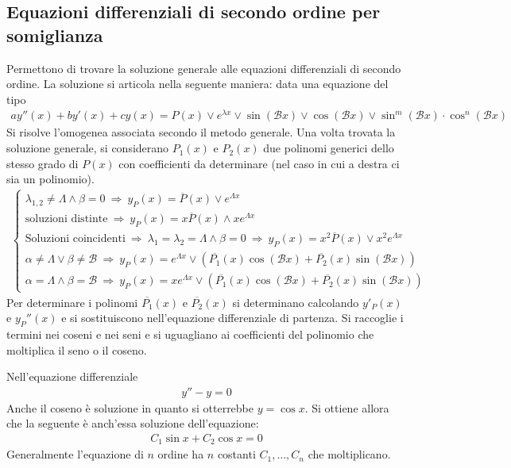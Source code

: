\documentclass[a4paper, oneside]{book}
\begin{document}
\subsection{Equazioni differenziali di secondo ordine per somiglianza}
Permettono di trovare la soluzione generale alle equazioni differenziali di 
secondo ordine. La soluzione si articola nella seguente maniera: data una 
equazione del tipo
\begin{gather*}
    ay''(x) + by'(x) + cy(x) = P(x) \vee e^{\lambda x} \vee \sin(\mathcal{B}x) \vee \cos(\mathcal{B}x) \vee \sin^{m}(\mathcal{B}x) \cdot \cos^{n}(\mathcal{B}x)
\end{gather*}
Si risolve l'omogenea associata secondo il metodo generale. Una volta trovata la soluzione generale, 
si considerano $P_1(x)$ e $P_2(x)$ due polinomi generici dello stesso grado di $P(x)$ 
con coefficienti da determinare (nel caso in cui a destra ci sia un polinomio). 
\begin{gather*}
    \left\{\begin{array}{l}
        \lambda_{1, 2} \neq \Lambda \wedge  \beta = 0 \ \Longrightarrow \ y_P(x) = \overline{P}(x) \vee e^{\Lambda x} \\
        \text{soluzioni distinte} \ \Longrightarrow \ y_P(x) = x\overline{P}(x) \wedge  xe^{\Lambda x} \\
        \text{Soluzioni coincidenti} \ \Longrightarrow \ \lambda_1 = \lambda_2  = \Lambda \wedge  \beta = 0 \ \Longrightarrow \ y_P(x) = x^{2} \overline{P}(x) \vee x^{2}e^{\Lambda x} \\
        \alpha \neq \Lambda \vee \beta \neq \mathcal{B} \ \Longrightarrow \ y_P(x) = e^{\Lambda x} \vee \left(\overline{P_1}(x) \cos(\mathcal{B}x) + \overline{P_2}(x) \sin(\mathcal{B}x) \right)  \\
        \alpha = \Lambda \wedge \beta = \mathcal{B} \ \Longrightarrow \ y_P(x) = xe^{\Lambda x} \vee \left(\overline{P_1}(x) \cos(\mathcal{B}x) + \overline{P_2}(x) \sin(\mathcal{B}x) \right)
    \end{array}\right.
\end{gather*}
Per determinare i polinomi $\overline{P_1}(x)$ e $\overline{P_2}(x)$ si determinano calcolando 
$y'_P(x)$ e $y_P''(x)$ e si sostituiscono nell'equazione differenziale di 
partenza. Si raccoglie i termini nei coseni e nei seni e si uguagliano ai coefficienti 
del polinomio che moltiplica il seno o il coseno.   

\begin{example}
    Nell'equazione differenziale
    \begin{gather*}
        y'' - y = 0
    \end{gather*}
    Anche il coseno è soluzione in quanto si otterrebbe $y = \cos x$. Si ottiene
    allora che la seguente è anch'essa soluzione dell'equazione:
    \begin{gather*}
        C_1 \sin x + C_2 \cos x = 0
    \end{gather*}
    Generalmente l'equazione di $n$ ordine ha $n$ costanti $C_1, \dots, C_n$ che moltiplicano. 
\end{example}
\end{document}
